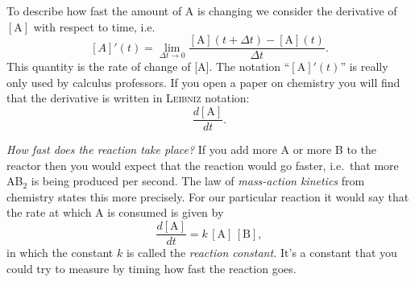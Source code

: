 To describe how fast the amount of A is changing we consider the derivative
of $[\textrm{A}]$ with respect to time, i.e.
\[
[A]'(t)= \lim_{\Delta t\to 0} 
\frac {[\textrm{A}](t+\Delta t) - [\textrm{A}](t)}  {\Delta t}.
\]
This quantity is the rate of change of [A].  The notation ``$[\textrm{A}]'(t)$'' is really
only used by calculus professors.  If you open a paper on chemistry you will find that the
derivative is written in \textsc{Leibniz} notation:
\[
\frac{d[\textrm{A}]}{dt}.
\]

\textit{How fast does the reaction take place?}  If you add more A or more B to the
reactor then you would expect that the reaction would go faster, i.e.\ that more
AB$_2$ is being produced per second.  The law of \textit{mass-action kinetics}
from chemistry states this more precisely. For our particular reaction it would
say that the rate at which A is consumed is given by
\[
\frac{d[\textrm{A}]}{dt} = k \, [\textrm{A}] \, [\textrm{B}],
\]
in which the constant $k$ is called the \textit{reaction constant. } It's a constant that
you could try to measure by timing how fast the reaction goes.

